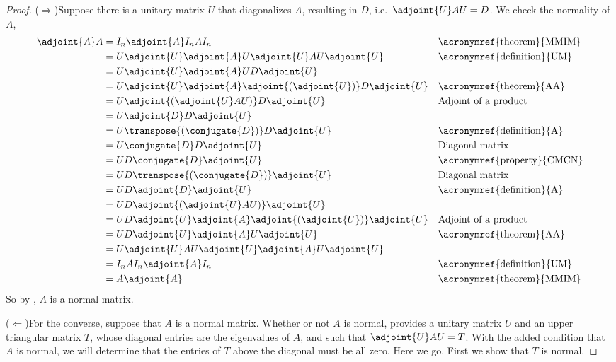 %
\begin{proof}
($\Rightarrow$)\quad  Suppose there is a unitary matrix $U$ that diagonalizes $A$, resulting in $D$, i.e.\ $\adjoint{U}AU=D$.  We check the normality of $A$,
%
\begin{align*}
\adjoint{A}A
&=I_n   \adjoint{A}   I_n   A  I_n&&\text{\acronymref{theorem}{MMIM}}\\
&=U\adjoint{U}   \adjoint{A}   U\adjoint{U}   A    U\adjoint{U}&&\text{\acronymref{definition}{UM}}\\
&=U  \adjoint{U}\adjoint{A}U    D    \adjoint{U}\\
&=U  \adjoint{U}\adjoint{A}\adjoint{\left(\adjoint{U}\right)}    D    \adjoint{U}&&\text{\acronymref{theorem}{AA}}\\
&=U  \adjoint{\left(\adjoint{U}AU\right)}    D    \adjoint{U}&&\text{Adjoint of a product}\\
&=U  \adjoint{D}    D    \adjoint{U}\\
&=U  \transpose{\left(\conjugate{D}\right)}    D    \adjoint{U}&&\text{\acronymref{definition}{A}}\\
&=U  \conjugate{D}    D    \adjoint{U}&&\text{Diagonal matrix}\\
&=U  D    \conjugate{D}    \adjoint{U}&&\text{\acronymref{property}{CMCN}}\\
&=U  D    \transpose{\left(\conjugate{D}\right)}    \adjoint{U}&&\text{Diagonal matrix}\\
&=U  D    \adjoint{D}    \adjoint{U}&&\text{\acronymref{definition}{A}}\\
&=U  D    \adjoint{\left(\adjoint{U}AU\right)}    \adjoint{U}\\
&=U  D    \adjoint{U}\adjoint{A}\adjoint{\left(\adjoint{U}\right)}    \adjoint{U}&&\text{Adjoint of a product}\\
&=U  D    \adjoint{U}\adjoint{A}U    \adjoint{U}&&\text{\acronymref{theorem}{AA}}\\
&=U  \adjoint{U}AU    \adjoint{U}\adjoint{A}U    \adjoint{U}\\
&=I_n A I_n \adjoint{A} I_n&&\text{\acronymref{definition}{UM}}\\
&=A\adjoint{A}&&\text{\acronymref{theorem}{MMIM}}
\end{align*}
%
So by , $A$ is a normal matrix.\par
%
($\Leftarrow$)\quad For the converse, suppose that $A$ is a normal matrix.   Whether or not $A$ is normal,  provides a unitary matrix $U$ and an upper triangular matrix $T$, whose diagonal entries are the eigenvalues of $A$, and such that $\adjoint{U}AU=T$.  With the added condition that $A$ is normal, we will determine that the entries of $T$ above the diagonal must be all zero.  Here we go.  First we show that $T$ is normal.

\end{proof}
